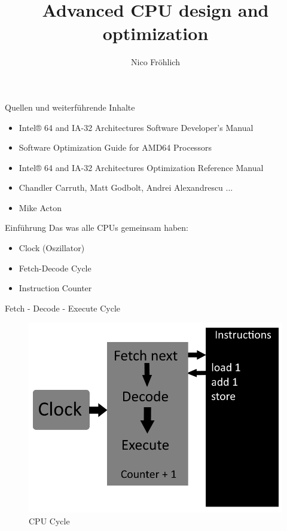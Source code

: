 \documentclass[11pt]{beamer}
\author{Nico Fröhlich}
\title{Advanced CPU design and optimization}
\institute{Troblecodings}
\begin{document}
\begin{frame}
    \titlepage
\end{frame}

\begin{frame}{Quellen und weiterführende Inhalte}
    \begin{itemize}
        \item Intel® 64 and IA-32 Architectures Software Developer’s Manual
        \item Software Optimization Guide for AMD64 Processors
        \item Intel® 64 and IA-32 Architectures Optimization Reference Manual
        \item Chandler Carruth, Matt Godbolt, Andrei Alexandrescu ...
        \item Mike Acton
    \end{itemize}
\end{frame}

\begin{frame}{Einführung}
Das was alle CPUs gemeinsam haben:
    \begin{itemize}
        \item Clock (Oszillator)
        \item Fetch-Decode Cycle
        \item Instruction Counter
    \end{itemize}
\end{frame}

\begin{frame}{Fetch - Decode - Execute Cycle}
\begin{figure}[hbtp]
\centering
\includegraphics[scale=.4]{cpucycle.png}
\caption{CPU Cycle}
\end{figure}
\end{frame}
\end{document}
